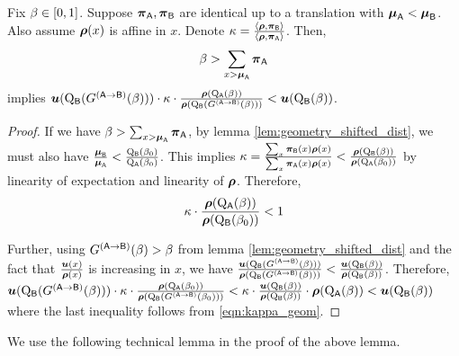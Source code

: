 	
	\begin{lem}\label{cor:compare_dp_eo}
		
		Fix $\accrate \in[0,1]$. Suppose $\dist\supa, \dist\supb$ are identical up to a translation with $\mean\supa < \mean\supb$. Also assume $\pb(x)$ is affine in $x$. Denote $\kappa =\frac{\langle \pb, \distb\rangle}{ \langle \pb, \dista\rangle}$.
		Then, \[\accrate > \sum_{x > \mean \supa } \dist\supa \]
		implies $\util(\RCDFtwo(\transfer(\accrate)))\cdot\kappa \cdot  \frac{\pb(\RCDF\supa(\accrate))}{\pb(\RCDF\supb(\transfer(\accrate)))}  < \util(\RCDFtwo(\accrate))$.
		\begin{proof}
			
			If we have $\accrate > \sum_{x > \mean \supa } \dist\supa$, by lemma \ref{lem:geometry_shifted_dist}, we must also have $\frac{\mean\supb}{\mean\supa} < \frac{\RCDFtwo(\accrate_0)}{\RCDFone(\accrate_0)}$. This implies $\kappa=\frac{\sum_x\dist\supb(x)\pb(x)}{\sum_x\dist\supa(x)\pb(x)} <\frac{\pb(\RCDFtwo(\accrate))}{\pb(\RCDFone(\accrate_0))}  $ by linearity of expectation and linearity of $\pb$. Therefore, 
			\begin{equation}
			\kappa \cdot \frac{\pb(\RCDFone(\accrate))}{\pb(\RCDFtwo(\accrate_0))} <1 \label{eqn:kappa_geom}
			\end{equation} 
			
			Further, using $\transfer(\accrate) > \accrate$ from lemma \ref{lem:geometry_shifted_dist} and the fact that $\frac{\util(x)}{\pb(x)}$ is increasing in $x$, we have $\frac{\util(\RCDFtwo(\transfer(\accrate)))}{ \pb(\RCDFtwo(\transfer(\accrate)))}<\frac{\util(\RCDFtwo(\accrate))}{ \pb(\RCDFtwo(\accrate))}  $. Therefore, $ \util(\RCDFtwo(\transfer(\accrate)))\cdot \kappa \cdot  \frac{\pb(\RCDF\supa(\accrate_0))}{\pb(\RCDF\supb(\transfer(\accrate_0)))} < \kappa \cdot \frac{\util(\RCDFtwo(\accrate))}{ \pb(\RCDFtwo(\accrate))}  \cdot \pb(\RCDF\supa(\accrate)) <\util(\RCDFtwo(\accrate))$ where the last inequality follows from \eqref{eqn:kappa_geom}.
			
		\end{proof}
	\end{lem}
	
	We use the following technical lemma in the proof of the above lemma.
	

